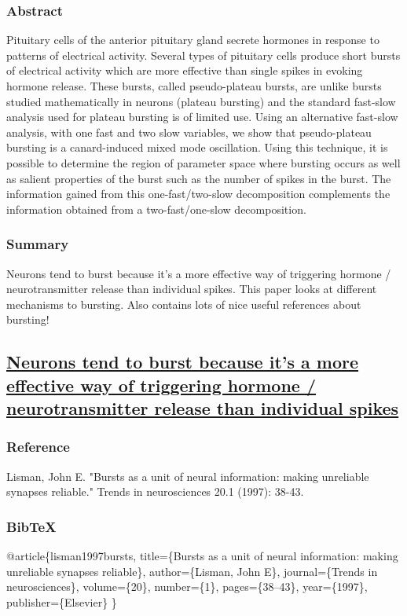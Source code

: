 \documentclass[11pt]{article}
\begin{document}
\subsubsection{Abstract}
\label{sec:org261622f}
Pituitary cells of the anterior pituitary gland secrete hormones in
response to patterns of electrical activity. Several types of
pituitary cells produce short bursts of electrical activity which are
more effective than single spikes in evoking hormone release. These
bursts, called pseudo-plateau bursts, are unlike bursts studied
mathematically in neurons (plateau bursting) and the standard
fast-slow analysis used for plateau bursting is of limited use. Using
an alternative fast-slow analysis, with one fast and two slow
variables, we show that pseudo-plateau bursting is a canard-induced
mixed mode oscillation. Using this technique, it is possible to
determine the region of parameter space where bursting occurs as well
as salient properties of the burst such as the number of spikes in the
burst. The information gained from this one-fast/two-slow
decomposition complements the information obtained from a
two-fast/one-slow decomposition.

\subsubsection{Summary}
\label{sec:orga2d8f1b}
Neurons tend to burst because it's a more effective way of triggering hormone / neurotransmitter release than individual spikes.
This paper looks at different mechanisms to bursting.
Also contains lots of nice useful references about bursting!

\subsection{\href{https://www.sciencedirect.com/science/article/pii/S0166223696100709}{Neurons tend to burst because it's a more effective way of triggering hormone / neurotransmitter release than individual spikes}}
\label{sec:org1b5ff53}
\subsubsection{Reference}
\label{sec:org46dac86}
Lisman, John E. "Bursts as a unit of neural information: making unreliable synapses reliable." Trends in neurosciences 20.1 (1997): 38-43.

\subsubsection{BibTeX}
\label{sec:org875291b}
@article\{lisman1997bursts,
  title=\{Bursts as a unit of neural information: making unreliable synapses reliable\},
  author=\{Lisman, John E\},
  journal=\{Trends in neurosciences\},
  volume=\{20\},
  number=\{1\},
  pages=\{38--43\},
  year=\{1997\},
  publisher=\{Elsevier\}
\}
\end{document}
